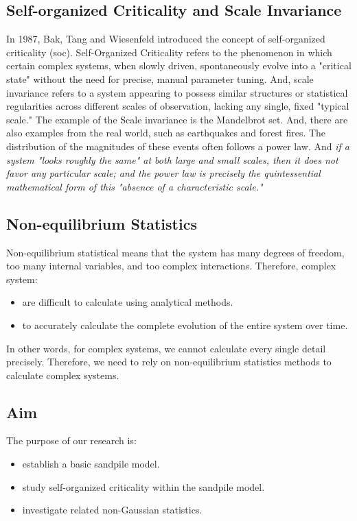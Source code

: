 \documentclass{article}
\begin{document}
\subsection{Self-organized Criticality and Scale Invariance}
In 1987, Bak, Tang and Wiesenfeld introduced the concept of self-organized criticality (soc). Self-Organized Criticality refers to the phenomenon in which certain complex systems, when slowly driven, spontaneously evolve into a "critical state" without the need for precise, manual parameter tuning. And, scale invariance refers to a system appearing to possess similar structures or statistical regularities across different scales of observation, lacking any single, fixed "typical scale." The example of the Scale invariance is the Mandelbrot set. And, there are also examples from the real world, such as earthquakes and forest fires. The distribution of the magnitudes of these events often follows a power law. And \textit{if a system "looks roughly the same" at both large and small scales, then it does not favor any particular scale; and the power law is precisely the quintessential mathematical form of this "absence of a characteristic scale."} 

\subsection{Non-equilibrium Statistics}
Non-equilibrium statistical means that the system has many degrees of freedom, too many internal variables, and too complex interactions. Therefore, complex system:

\begin{itemize}
    \item  are difficult to calculate using analytical methods.
    \item to accurately calculate the complete evolution of the entire system over time.
\end{itemize}

In other words, for complex systems, we cannot calculate every single detail precisely. Therefore, we need to rely on non-equilibrium statistics methods to calculate complex systems.

\subsection{Aim}
The purpose of our research is:
\begin{itemize}
    \item establish a basic sandpile model.
    \item study self-organized criticality within the sandpile model.
    \item investigate related non-Gaussian statistics.
\end{itemize}
\end{document}
